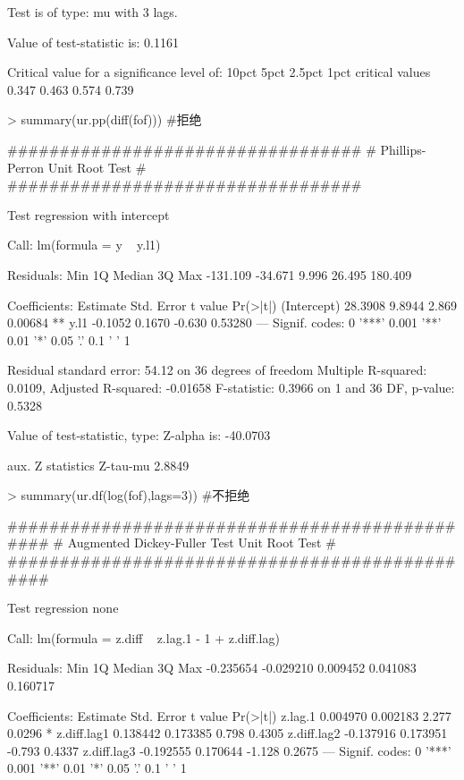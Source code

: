 \documentclass{article}
\begin{document}
\begin{Schunk}
\begin{Soutput}
Test is of type: mu with 3 lags. 

Value of test-statistic is: 0.1161 

Critical value for a significance level of: 
                10pct  5pct 2.5pct  1pct
critical values 0.347 0.463  0.574 0.739
\end{Soutput}
\begin{Sinput}
> summary(ur.pp(diff(fof))) #拒绝
\end{Sinput}
\begin{Soutput}
################################## 
# Phillips-Perron Unit Root Test # 
################################## 

Test regression with intercept 


Call:
lm(formula = y ~ y.l1)

Residuals:
     Min       1Q   Median       3Q      Max 
-131.109  -34.671    9.996   26.495  180.409 

Coefficients:
            Estimate Std. Error t value Pr(>|t|)   
(Intercept)  28.3908     9.8944   2.869  0.00684 **
y.l1         -0.1052     0.1670  -0.630  0.53280   
---
Signif. codes:  0 '***' 0.001 '**' 0.01 '*' 0.05 '.' 0.1 ' ' 1

Residual standard error: 54.12 on 36 degrees of freedom
Multiple R-squared:  0.0109,	Adjusted R-squared:  -0.01658 
F-statistic: 0.3966 on 1 and 36 DF,  p-value: 0.5328


Value of test-statistic, type: Z-alpha  is: -40.0703 

         aux. Z statistics
Z-tau-mu            2.8849
\end{Soutput}
\begin{Sinput}
> summary(ur.df(log(fof),lags=3)) #不拒绝
\end{Sinput}
\begin{Soutput}
############################################### 
# Augmented Dickey-Fuller Test Unit Root Test # 
############################################### 

Test regression none 


Call:
lm(formula = z.diff ~ z.lag.1 - 1 + z.diff.lag)

Residuals:
      Min        1Q    Median        3Q       Max 
-0.235654 -0.029210  0.009452  0.041083  0.160717 

Coefficients:
             Estimate Std. Error t value Pr(>|t|)  
z.lag.1      0.004970   0.002183   2.277   0.0296 *
z.diff.lag1  0.138442   0.173385   0.798   0.4305  
z.diff.lag2 -0.137916   0.173951  -0.793   0.4337  
z.diff.lag3 -0.192555   0.170644  -1.128   0.2675  
---
Signif. codes:  0 '***' 0.001 '**' 0.01 '*' 0.05 '.' 0.1 ' ' 1


\end{Soutput}
\end{Schunk}
\end{document}
